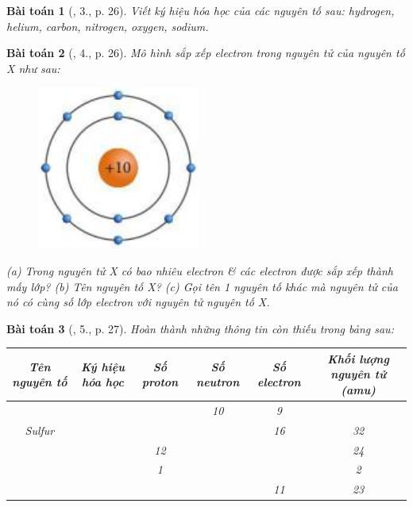 \documentclass{article}
\newtheorem{baitoan}{Bài toán}
\begin{document}
\begin{baitoan}[\cite{SGK_KHTN_7_Canh_Dieu}, 3., p. 26]
	Viết ký hiệu hóa học của các nguyên tố sau: hydrogen, helium, carbon, nitrogen, oxygen, sodium.
\end{baitoan}

\begin{baitoan}[\cite{SGK_KHTN_7_Canh_Dieu}, 4., p. 26]
	Mô hình sắp xếp electron trong nguyên tử của nguyên tố X như sau:
	\begin{figure}[H]
		\centering
		\includegraphics[scale=0.3]{SGK_KHTN_7_CD_p_26}
	\end{figure}
	\noindent(a) Trong nguyên tử X có bao nhiêu electron \& các electron được sắp xếp thành mấy lớp? (b) Tên nguyên tố X? (c) Gọi tên 1 nguyên tố khác mà nguyên tử của nó có cùng số lớp electron với nguyên tử nguyên tố X.
\end{baitoan}

\begin{baitoan}[\cite{SGK_KHTN_7_Canh_Dieu}, 5., p. 27]
	Hoàn thành những thông tin còn thiếu trong bảng sau:
	\begin{table}[H]
		\centering
		\begin{tabular}{|c|c|c|c|c|c|}
			\hline
			 Tên nguyên tố & Ký hiệu hóa học & Số proton & Số neutron & Số electron & Khối lượng nguyên tử (amu) \\
			\hline
			&  &  & 10 & 9 &  \\
			\hline
			Sulfur &  &  &  & 16 & 32 \\
			\hline
			&  & 12 &  &  & 24 \\
			\hline
			&  & 1 &  &  & 2 \\
			\hline
			&  &  &  & 11 & 23 \\
			\hline
		\end{tabular}
	\end{table}
\end{baitoan}
\end{document}
